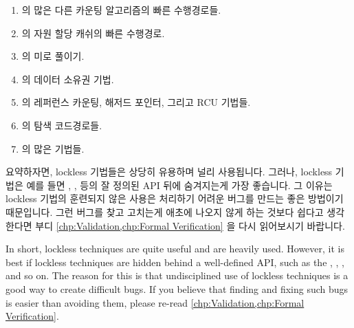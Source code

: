\begin{enumerate}
\item	{} 의 많은 다른 카운팅 알고리즘의 빠른 수행경로들.
\item	{} 의 자원 할당 캐쉬의 빠른
	수행경로.
\item	{} 의 미로 풀이기.
\item	{} 의 데이터 소유권 기법.
\item	{} 의 레퍼런스 카운팅, 해저드 포인터,
	그리고 RCU 기법들.
\item	{} 의 탐색 코드경로들.
\item	{} 의 많은 기법들.

\iffalse

\item	The fastpaths through a number of other counting algorithms
	in \cref{chp:Counting}.
\item	The fastpath through resource allocator caches in
	\cref{sec:SMPdesign:Resource Allocator Caches}.
\item	The maze solver in \cref{sec:SMPdesign:Beyond Partitioning}.
\item	The data-ownership techniques in \cref{chp:Data Ownership}.
\item	The reference-counting, hazard-pointer, and RCU techniques
	in \cref{chp:Deferred Processing}.
\item	The lookup code paths in \cref{chp:Data Structures}.
\item	Many of the techniques in \cref{chp:Putting It All Together}.

\fi

\end{enumerate}

요약하자면, lockless 기법들은 상당히 유용하며 널리 사용됩니다.
그러나, lockless 기법은 예를 들면 , ,
 등의 잘 정의된 API 뒤에 숨겨지는게 가장 좋습니다.
그 이유는 lockless 기법의 훈련되지 않은 사용은 처리하기 어려운 버그를 만드는
좋은 방법이기 때문입니다.
그런 버그를 찾고 고치는게 애초에 나오지 않게 하는 것보다 쉽다고 생각한다면 부디
\cref{chp:Validation,chp:Formal Verification} 을 다시 읽어보시기 바랍니다.

\iffalse

In short, lockless techniques are quite useful and are heavily used.
However, it is best if lockless techniques are hidden behind a
well-defined API, such as the , ,
, and so on.
The reason for this is that undisciplined use of lockless techniques
is a good way to create difficult bugs.
If you believe that finding and fixing such bugs is easier than avoiding
them, please re-read
\cref{chp:Validation,chp:Formal Verification}.

